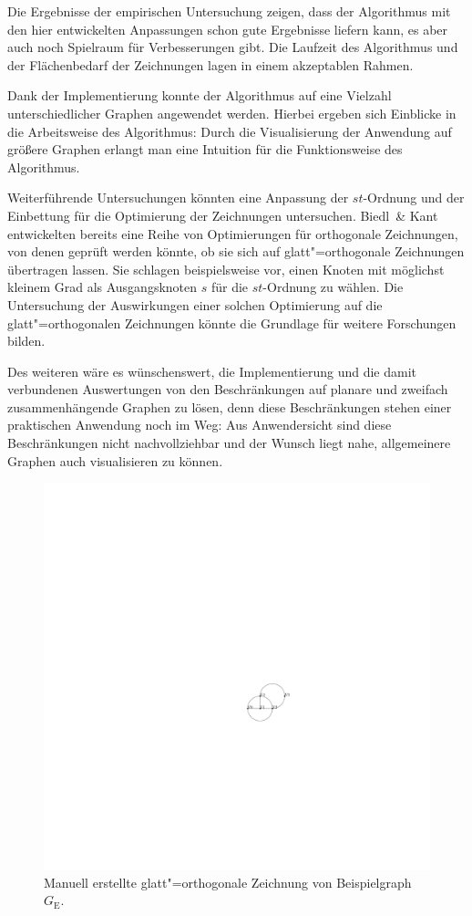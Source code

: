 \documentclass[a4paper]{scrreprt}
\theoremstyle{definition}
\begin{document}
Die Ergebnisse der empirischen Untersuchung zeigen, dass der Algorithmus mit den hier entwickelten Anpassungen schon gute Ergebnisse liefern kann, es aber auch noch Spielraum für Verbesserungen gibt. Die Laufzeit des Algorithmus und der Flächenbedarf der Zeichnungen lagen in einem akzeptablen Rahmen.

Dank der Implementierung konnte der Algorithmus auf eine Vielzahl unterschiedlicher Graphen angewendet werden. Hierbei ergeben sich Einblicke in die Arbeitsweise des Algorithmus: Durch die Visualisierung der Anwendung auf größere Graphen erlangt man eine Intuition für die Funktionsweise des Algorithmus.

Weiterführende Untersuchungen könnten eine Anpassung der $st$-Ordnung und der Einbettung für die Optimierung der Zeichnungen untersuchen. Biedl~\& Kant ~\cite{biedl+kant-98} entwickelten bereits eine Reihe von Optimierungen für orthogonale Zeichnungen, von denen geprüft werden könnte, ob sie sich auf glatt"=orthogonale Zeichnungen übertragen lassen. Sie schlagen beispielsweise vor, einen Knoten mit möglichst kleinem Grad als Ausgangsknoten $s$ für die $st$-Ordnung zu wählen. Die Untersuchung der Auswirkungen einer solchen Optimierung auf die glatt"=orthogonalen Zeichnungen könnte die Grundlage für weitere Forschungen bilden.

Des weiteren wäre es wünschenswert, die Implementierung und die damit verbundenen Auswertungen von den Beschränkungen auf planare und zweifach zusammenhängende Graphen zu lösen, denn diese Beschränkungen stehen einer praktischen Anwendung noch im Weg: Aus Anwendersicht sind diese Beschränkungen nicht nachvollziehbar und der Wunsch liegt nahe, allgemeinere Graphen auch visualisieren zu können.

\begin{figure}[h]
  \centering
  \includegraphics{exampleA/smoothHanddrawn}
  \caption{Manuell erstellte glatt"=orthogonale Zeichnung von Beispielgraph $G_\text{E}$.}
  \label{fig:exampleAsmoothHanddrawn}
\end{figure}
\end{document}
